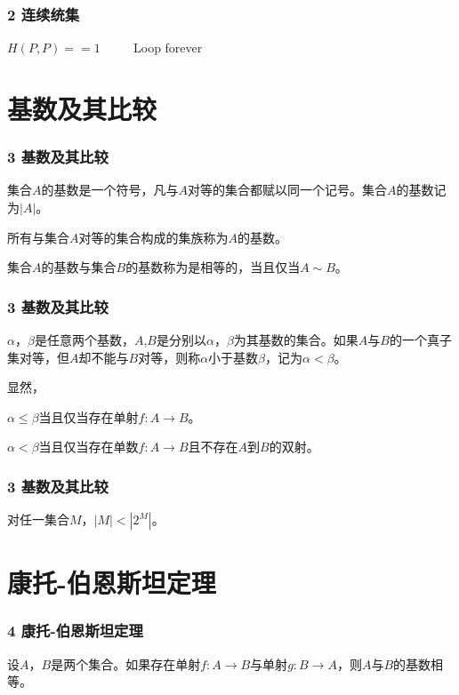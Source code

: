 \documentclass{beamer}
\begin{document}
\begin{CJK*}{UTF8}{gbsn}
\begin{frame}
  \frametitle{2 连续统集}
    \begin{codebox}
    \li \If $H(P,P) == 1$ 
    \li  $\quad\quad$\Return
    \li \ElseNoIf Loop forever
    \End
  \end{codebox}  
\end{frame}

\section{基数及其比较}
\begin{frame}
  \frametitle{3 基数及其比较}
  \begin{Def}
    集合$A$的基数是一个符号，凡与$A$对等的集合都赋以同一个记号。集合$A$的基数记为$|A|$。
  \end{Def}
  \begin{Def}
    所有与集合$A$对等的集合构成的集族称为$A$的基数。
  \end{Def}
    \begin{Def}
    集合$A$的基数与集合$B$的基数称为是相等的，当且仅当$A \sim B$。
  \end{Def}
\end{frame}

\begin{frame}
  \frametitle{3 基数及其比较}
  \begin{Def}
    $\alpha$，$\beta$是任意两个基数，$A$,$B$是分别以$\alpha$，$\beta$为其基数的集合。如果$A$与$B$的一个真子集对等，但$A$却不能与$B$对等，则称$\alpha$小于基数$\beta$，记为$\alpha < \beta$。
  \end{Def}\pause
  显然，

  $\alpha \leq \beta$当且仅当存在单射$f:A \to B$。

  $\alpha < \beta$当且仅当存在单数$f:A \to B$且不存在$A$到$B$的双射。
\end{frame}

\begin{frame}
  \frametitle{3 基数及其比较}
  \begin{Thm}[康托]
    对任一集合$M$，$|M| < |2^{M}|$。
  \end{Thm}
\end{frame}

\section{康托-伯恩斯坦定理}
\begin{frame}
  \frametitle{4 康托-伯恩斯坦定理}
  \begin{Thm}[康托-伯恩斯坦]
    设$A$，$B$是两个集合。如果存在单射$f:A\to B$与单射$g:B\to A$，则$A$与$B$的基数相等。
  \end{Thm}
\end{frame}



\end{CJK*}
\end{document}
